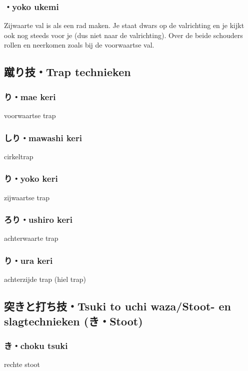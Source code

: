 \subsubsection{・yoko ukemi}
Zijwaarte val is als een rad maken. Je staat dwars op de valrichting en je kijkt ook nog steeds voor je (dus niet naar de valrichting). Over de beide schouders rollen en neerkomen zoals bij de voorwaartse val.

\subsection{蹴り技・Trap technieken}
\subsubsection{り・mae keri}
voorwaartse trap

\subsubsection{しり・mawashi keri}
cirkeltrap

\subsubsection{り・yoko keri} 
zijwaartse trap

\subsubsection{ろり・ushiro keri}
achterwaarte trap   

\subsubsection{り・ura keri}
achterzijde trap (hiel trap)

\subsection{突きと打ち技・Tsuki to uchi waza/Stoot- en slagtechnieken ({\bfseries{}き・Stoot})}
\subsubsection{き・choku tsuki}
rechte stoot

